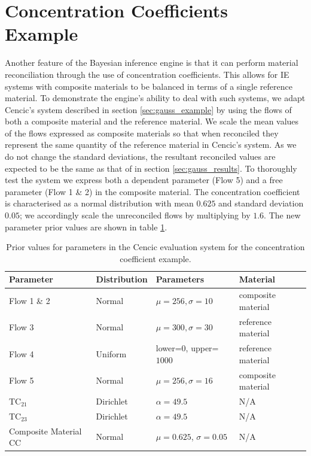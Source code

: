 \documentclass[ %
                    author={Tom Jager},
                supervisor={Dr. Daniel Schien},
                    degree={MEng},
                     title={A Bayesian Inference Engine for Calibrating Uncertainty over UMIS Structured MFA Systems},
                  subtitle={},
                      type={research},
                      year={2019} ]{dissertation}
\begin{document}
\section{Concentration Coefficients Example}
\label{sec:cc_example}
Another feature of the Bayesian inference engine is that it can perform material reconciliation through the use of concentration coefficients. This allows for IE systems with composite materials to be balanced in terms of a single reference material. To demonstrate the engine's ability to deal with such systems, we adapt Cencic's system described in section \ref{sec:gauss_example} by using the flows of both a composite material and the reference material. We scale the mean values of the flows expressed as composite materials so that when reconciled they represent the same quantity of the reference material in Cencic's system. As we do not change the standard deviations, the resultant reconciled values are expected to be the same as that of in section \ref{sec:gauss_results}. To thoroughly test the system we express both a dependent parameter (Flow 5) and a free parameter (Flow 1 \& 2) in the composite material. The concentration coefficient is characterised as a normal distribution with mean $0.625$ and standard deviation $0.05$; we accordingly scale the unreconciled flows by multiplying by $1.6$. The new parameter prior values are shown in table \ref{table:conc_coeff_params}.

\begin{table}[]
\center
\begin{tabular}{|l|l|l|l|}
\hline
\textbf{Parameter}    & \textbf{Distribution} & \textbf{Parameters}  & \textbf{Material}  \\ \hline
Flow 1 \& 2           & Normal                & $\mu=256, \sigma=10$        & composite material \\ \hline
Flow 3                & Normal                & $\mu=300, \sigma=30$        & reference material \\ \hline
Flow 4                & Uniform               & lower=$0$, upper=$1000$  & reference material \\ \hline
Flow 5                & Normal                & $\mu=256, \sigma=16$        & composite material \\ \hline
TC$_{21}$            & Dirichlet             & $\alpha=49.5$           & N/A                \\ \hline
TC$_{23}$            & Dirichlet             & $\alpha=49.5$           & N/A                \\ \hline
Composite Material CC & Normal                & $\mu=0.625$, $\sigma=0.05$ & N/A                \\ \hline
\end{tabular}
\caption{Prior values for parameters in the Cencic evaluation system for the concentration coefficient example.}
\label{table:conc_coeff_params}
\end{table}
\end{document}
